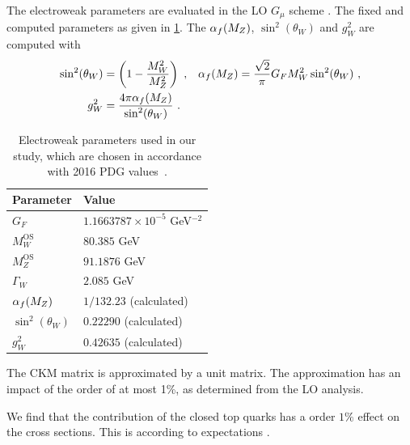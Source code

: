 The electroweak parameters are evaluated in the LO $G_\mu$ scheme \cite{Denner2000c}. The fixed and computed
parameters as given in \cref{tab:ewinput}. The $\alpha_f(M_Z)$,
$\sin^2(\theta_W)$ and $g_W^2$ are computed with
\begin{align}\label{eq:ewlorel}
\sin^2(\theta_W) &= \left(1-\frac{M_W^2}{M_Z^2}\right)\ , & \alpha_f(M_Z)&=\frac{\sqrt{2}}{\pi}G_F M_W^2
  \sin^2(\theta_W)\ ,\notag\\
g_W^2&=\frac{4\pi\alpha_f(M_Z) }{\sin^2(\theta_W)}\ .
\end{align}

\begin{table}[]
  \centering
  \begin{tabular}{p{3.5cm}p{5cm}}
    \toprule
    Parameter & Value  \\
    \midrule
    $G_F$ & $1.1663787 \times 10^{-5}$ GeV$^{-2}$ \\
    $M_W^{\text{OS}}$& $80.385$ GeV \\
    $M_Z^{\text{OS}}$& $91.1876$ GeV \\
    $\Gamma_W$& $2.085$ GeV \\
    $\alpha_f(M_Z)$ & $1/132.23$ (calculated)\\
    $\sin^2(\theta_W)$ & $0.22290$ (calculated)\\
    $g_W^2$ & $0.42635$ (calculated)\\
    \bottomrule
  \end{tabular}
  \caption{Electroweak parameters used in our study, which are chosen in accordance with 2016 PDG values~\cite{Patrignani:2016xqp}.}
  \label{tab:ewinput}
\end{table}

The CKM matrix is approximated by a unit matrix. 
The approximation has an impact of the order of at most 1\%,
as determined from the LO analysis.

We find that the contribution of the closed top quarks has a order $1\%$ effect on
the cross sections. This is according to expectations \cite{Campbell:2016tcu}. 

